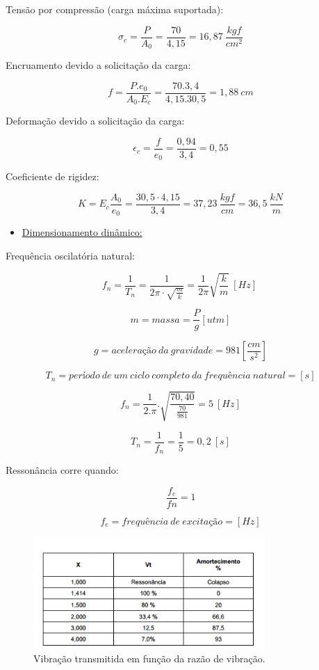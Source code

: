 \noindent Tensão por compressão (carga máxima suportada):

\[{\sigma}_c = \frac{P}{A_0} = \frac{70}{4,15} = 16,87 \ \frac{kgf}{cm^2}\]

\noindent Encruamento devido a solicitação da carga:

\[f = \frac{P.e_0}{A_0.E_c} = \frac{70.3,4}{4,15.30,5} = 1,88 \ cm\] 

\noindent Deformação devido a solicitação da carga:

\[{\epsilon }_c=\frac{f}{e_0}=\frac{0,94}{3,4}=0,55\] 

\noindent Coeficiente de rigidez:

\[K = E_c\frac{A_0}{e_0} = \frac{30,5 \cdot 4,15}{3,4} = 37,23 \ \frac{kgf}{cm} = 36,5 \ \frac{kN}{m} \]

\begin{itemize}
	\item \underline{Dimensionamento dinâmico:}
\end{itemize}

\noindent Frequência oscilatória natural:

\[f_n = \frac{1}{T_n} = \frac{1}{2 \pi \cdot \sqrt{\frac{m}{k}}} = \frac{1}{2\pi}\sqrt{\frac{k}{m}} \ \left[Hz\right]\ \]

\[m = massa = \frac{P}{g} \left[utm\right]\] 

\[g = acelera\textrm{\c{c}}\textrm{\~{a}}o\ da\ gravidade=981\left[\frac{cm}{s^2}\right]\] 

\[T_n=per\textrm{\'{i}}odo\ de\ um\ ciclo\ completo\ da\ frequ\textrm{\^{e}}ncia\ natural=[s]\] 

\[f_n=\frac{1}{2.\pi }.\sqrt{\frac{70,40}{\frac{70}{981}}}=5\ \left[Hz\right]\] 

\[T_n=\frac{1}{f_n}=\frac{1}{5}=0,2\ [s]\] 

\noindent Ressonância corre quando:

\[\frac{f_e}{fn}=1\] 

\[f_e=frequ\textrm{\^{e}}ncia\ de\ excita\textrm{\c{c}}\textrm{\~{a}}o=\left[Hz\right]\] 

\begin{figure}[H]
	\centering
	\includegraphics[width=250pt]{figuras/vibracao_transmitida.png}
	\caption{Vibração transmitida em função da razão de vibração.}
\end{figure}

